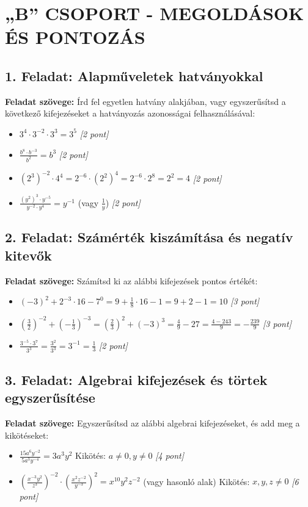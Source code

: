 \documentclass[11pt,a4paper]{article}
\begin{document}
\newpage

\section*{„B” CSOPORT - MEGOLDÁSOK ÉS PONTOZÁS}

\subsection*{1. Feladat: Alapműveletek hatványokkal}
\textbf{Feladat szövege:} Írd fel egyetlen hatvány alakjában, vagy egyszerűsítsd a következő kifejezéseket a hatványozás azonosságai felhasználásával:
\begin{itemize}
    \item[a)] $3^4 \cdot 3^{-2} \cdot 3^3 = 3^5$ \hfill \textit{[2 pont]}
    \item[b)] $\frac{b^8 \cdot b^{-3}}{b^2} = b^3$ \hfill \textit{[2 pont]}
    \item[c)] $(2^3)^{-2} \cdot 4^4 = 2^{-6} \cdot (2^2)^4 = 2^{-6} \cdot 2^8 = 2^2 = 4$ \hfill \textit{[2 pont]}
    \item[d)] $\frac{(y^2)^3 \cdot y^{-5}}{y^{-2} \cdot y^4} = y^{-1}$ (vagy $\frac{1}{y}$) \hfill \textit{[2 pont]}
\end{itemize}

\subsection*{2. Feladat: Számérték kiszámítása és negatív kitevők}
\textbf{Feladat szövege:} Számítsd ki az alábbi kifejezések pontos értékét:
\begin{itemize}
    \item[a)] $(-3)^2 + 2^{-3} \cdot 16 - 7^0 = 9 + \frac{1}{8} \cdot 16 - 1 = 9 + 2 - 1 = 10$ \hfill \textit{[3 pont]}
    \item[b)] $\left(\frac{3}{2}\right)^{-2} + \left(-\frac{1}{3}\right)^{-3} = \left(\frac{2}{3}\right)^2 + (-3)^3 = \frac{4}{9} - 27 = \frac{4 - 243}{9} = -\frac{239}{9}$ \hfill \textit{[3 pont]}
    \item[c)] $\frac{3^{-5} \cdot 3^7}{3^3} = \frac{3^2}{3^3} = 3^{-1} = \frac{1}{3}$ \hfill \textit{[2 pont]}
\end{itemize}

\subsection*{3. Feladat: Algebrai kifejezések és törtek egyszerűsítése}
\textbf{Feladat szövege:} Egyszerűsítsd az alábbi algebrai kifejezéseket, és add meg a kikötéseket:
\begin{itemize}
    \item[a)] $\frac{15a^6 y^{-2}}{5a^3 y^{-4}} = 3a^3 y^2$ \quad Kikötés: $a \neq 0, y \neq 0$ \hfill \textit{[4 pont]}
    \item[b)] $\left( \frac{x^{-3} y^2}{z^3} \right)^{-2} \cdot \left( \frac{x^2 z^{-2}}{y^{-3}} \right)^2 = x^{10} y^2 z^{-2}$ (vagy hasonló alak) \quad Kikötés: $x,y,z \neq 0$ \hfill \textit{[6 pont]}
\end{itemize}
\end{document}
